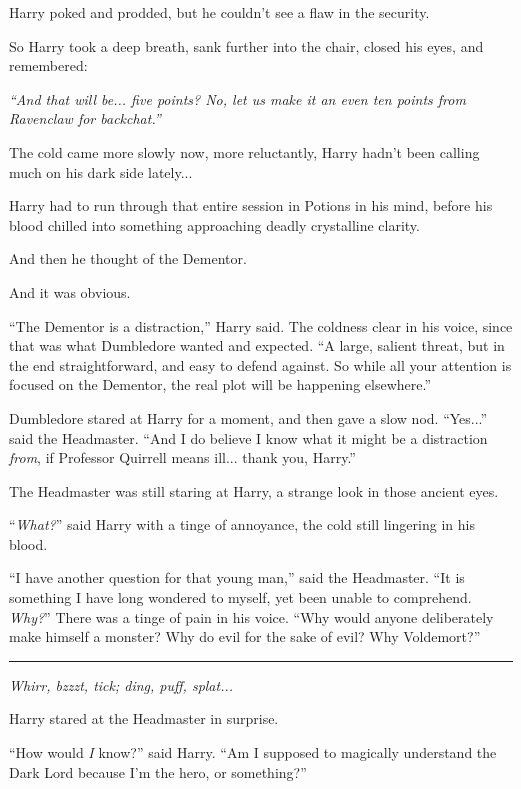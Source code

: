 Harry poked and prodded, but he couldn't see a flaw in the security.

So Harry took a deep breath, sank further into the chair, closed his eyes, and remembered:

\emph{``And that will be... five points? No, let us make it an even ten points from Ravenclaw for backchat.''}

The cold came more slowly now, more reluctantly, Harry hadn't been calling much on his dark side lately...

Harry had to run through that entire session in Potions in his mind, before his blood chilled into something approaching deadly crystalline clarity.

And then he thought of the Dementor.

And it was obvious.

``The Dementor is a distraction,'' Harry said. The coldness clear in his voice, since that was what Dumbledore wanted and expected. ``A large, salient threat, but in the end straightforward, and easy to defend against. So while all your attention is focused on the Dementor, the real plot will be happening elsewhere.''

Dumbledore stared at Harry for a moment, and then gave a slow nod. ``Yes...'' said the Headmaster. ``And I do believe I know what it might be a distraction \emph{from}, if Professor Quirrell means ill... thank you, Harry.''

The Headmaster was still staring at Harry, a strange look in those ancient eyes.

``\emph{What?}'' said Harry with a tinge of annoyance, the cold still lingering in his blood.

``I have another question for that young man,'' said the Headmaster. ``It is something I have long wondered to myself, yet been unable to comprehend. \emph{Why?}'' There was a tinge of pain in his voice. ``Why would anyone deliberately make himself a monster? Why do evil for the sake of evil? Why Voldemort?''

\begin{center}\rule{3in}{0.4pt}\end{center}

\emph{Whirr, bzzzt, tick; ding, puff, splat...}

Harry stared at the Headmaster in surprise.

``How would \emph{I} know?'' said Harry. ``Am I supposed to magically understand the Dark Lord because I'm the hero, or something?''

